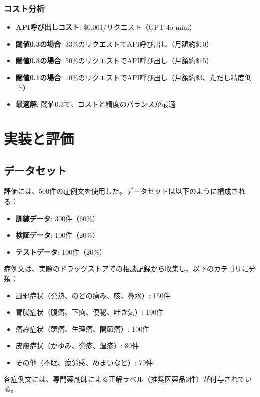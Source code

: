 \documentclass[a4paper,11pt,ja=standard,xelatex]{bxjsarticle}
\theoremstyle{definition}
\begin{document}
\subsubsection{コスト分析}

\begin{itemize}
\item \textbf{API呼び出しコスト}: \$0.001/リクエスト（GPT-4o-mini）
\item \textbf{閾値0.3の場合}: 33\%のリクエストでAPI呼び出し（月額約\$10）
\item \textbf{閾値0.5の場合}: 50\%のリクエストでAPI呼び出し（月額約\$15）
\item \textbf{閾値0.1の場合}: 10\%のリクエストでAPI呼び出し（月額約\$3、ただし精度低下）
\item \textbf{最適解}: 閾値0.3で、コストと精度のバランスが最適
\end{itemize}

\section{実装と評価}

\subsection{データセット}

評価には、500件の症例文を使用した。データセットは以下のように構成される：
\begin{itemize}
\item \textbf{訓練データ}: 300件（60\%）
\item \textbf{検証データ}: 100件（20\%）
\item \textbf{テストデータ}: 100件（20\%）
\end{itemize}

症例文は、実際のドラッグストアでの相談記録から収集し、以下のカテゴリに分類：
\begin{itemize}
\item 風邪症状（発熱、のどの痛み、咳、鼻水）: 150件
\item 胃腸症状（腹痛、下痢、便秘、吐き気）: 100件
\item 痛み症状（頭痛、生理痛、関節痛）: 100件
\item 皮膚症状（かゆみ、発疹、湿疹）: 80件
\item その他（不眠、疲労感、めまいなど）: 70件
\end{itemize}

各症例文には、専門薬剤師による正解ラベル（推奨医薬品3件）が付与されている。
\end{document}
